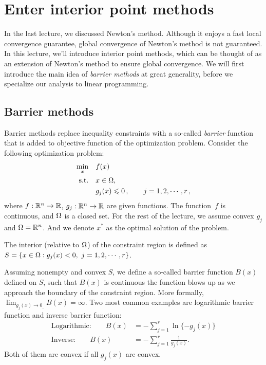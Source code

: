 \section{Enter interior point methods}
In the last lecture, we discussed Newton's method. Although it enjoys a fast local
convergence guarantee, global convergence of Newton's method is not guaranteed. 
In this lecture, we'll introduce interior point methods, which can be thought of
as an extension of Newton's method to ensure global convergence.  We will first
introduce the main idea of \emph{barrier methods} at great generality, before we
specialize our analysis to linear programming.

\subsection{Barrier methods}
Barrier methods replace inequality constraints with a so-called \emph{barrier}
function that is added to objective function of the optimization problem. 
Consider the following optimization problem: 
\begin{align*}
\min_x  &\quad f(x)\\
\text{s.t.} &\quad x\in{\Omega},\\
&\quad g_j(x)\leqslant{0}\,,\qquad j=1,2,\cdots,r\,,
\end{align*}
where $f:\mathbb{R}^n\rightarrow\mathbb{R}$, $g_j:\mathbb{R}^n\rightarrow\mathbb{R}$ are given functions. 
The function~$f$ is continuous, and $\Omega$ is a closed set. For the rest of the lecture, we assume convex $g_j$ and $\Omega=\mathbb{R}^n$. And we denote $x^*$ as the optimal solution of the problem.

\begin{definition}
The interior (relative to $\Omega$) of the constraint region is defined as $S=\{x\in\domain:g_j(x)<0,\ j=1,2,\cdots,r\}$. 
\end{definition}

Assuming nonempty and convex $S$, we define a so-called barrier function $B(x)$
defined on $S$, such that $B(x)$ is continuous the function blows up as we
approach the boundary of the constraint region. More formally,
$\lim_{g_j(x)\rightarrow{0_{\_}}}B(x)=\infty$. Two most common examples are
logarithmic barrier function and inverse barrier function: 
\begin{align}
\text{Logarithmic:}\qquad B(x) &= -\sum_{j=1}^{r}\ln\{-g_j(x)\}\\
\text{Inverse:}\qquad B(x) &= -\sum_{j=1}^{r}\frac{1}{g_j(x)}.
\end{align}
Both of them are convex if all $g_j(x)$ are convex. 

